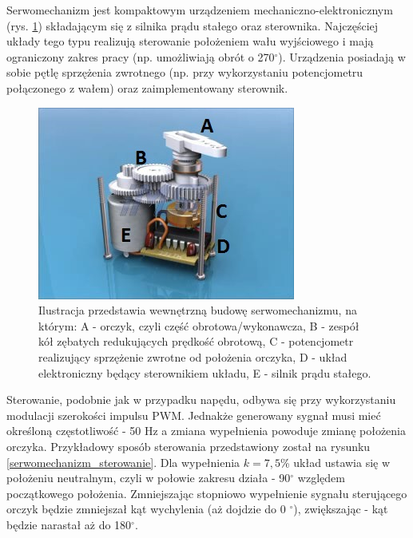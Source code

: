 Serwomechanizm jest kompaktowym urządzeniem mechaniczno-elektronicznym (rys. \ref{serwomechanizm}) składającym się z silnika prądu stałego oraz sterownika. Najczęściej układy tego typu realizują sterowanie położeniem wału wyjściowego i mają ograniczony zakres pracy (np. umożliwiają obrót o 270$^\circ$). Urządzenia posiadają w sobie pętlę sprzężenia zwrotnego (np. przy wykorzystaniu potencjometru połączonego z wałem) oraz zaimplementowany sterownik. 
  \begin{figure}[H]
    \begin{center}
      \includegraphics[scale=0.7]{imgs/serwo.jpg}
 	\caption[Model sewomechanizmu.]{\small{Ilustracja przedstawia wewnętrzną budowę serwomechanizmu, na którym: A - orczyk, czyli część obrotowa/wykonawcza, B - zespół kół zębatych redukujących prędkość obrotową, C - potencjometr realizujący sprzężenie zwrotne od położenia orczyka, D - układ elektroniczny będący sterownikiem układu, E - silnik prądu stałego.}\footnotemark}
	\label{serwomechanizm}
    \end{center}
  \end{figure}  
\noindent
Sterowanie, podobnie jak w przypadku napędu, odbywa się przy wykorzystaniu modulacji szerokości impulsu PWM. Jednakże generowany sygnał musi mieć określoną częstotliwość - 50 Hz a zmiana wypełnienia powoduje zmianę położenia orczyka. Przykładowy sposób sterowania przedstawiony został na rysunku \ref{serwomechanizm_sterowanie}. Dla wypełnienia $k=7,5$\% układ ustawia się w położeniu neutralnym, czyli w połowie zakresu działa - 90$^\circ$ względem początkowego położenia. Zmniejszając stopniowo wypełnienie sygnału sterującego orczyk będzie zmniejszał kąt wychylenia (aż dojdzie do 0 $^\circ$), zwiększając - kąt będzie narastał aż do 180$^\circ$.
